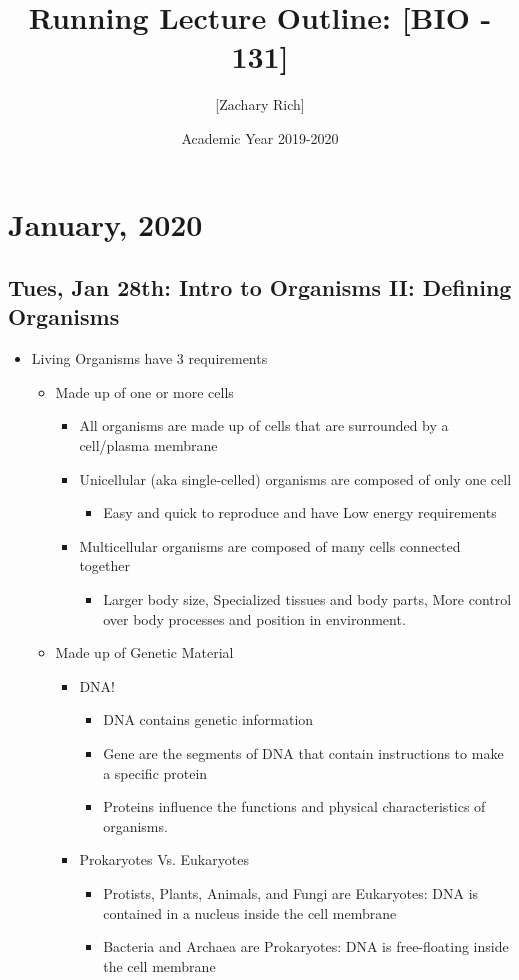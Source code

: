 \documentclass[10pt, oneside]{article}
\title{Running Lecture Outline: [BIO - 131]}
\author{[Zachary Rich]}
\date{Academic Year 2019-2020}
\begin{document}
\maketitle
\tableofcontents

\vspace{.25in}

\section{January, 2020}

\subsection{Tues, Jan 28th: Intro to Organisms II: Defining Organisms}

\begin{itemize}

\item Living Organisms have 3 requirements
\begin{itemize}
	\item Made up of one or more cells
	\begin{itemize}
		\item All organisms are made up of cells that are surrounded by a cell/plasma membrane
		\item Unicellular (aka single-celled) organisms are composed of only one cell
			\begin{itemize}
				\item Easy and quick to reproduce and have Low energy requirements
			\end{itemize}
		\item Multicellular organisms are composed of many cells connected together
			\begin{itemize}
				\item Larger body size, Specialized tissues and body parts, More control over body processes and position in environment.
			\end{itemize}
	\end{itemize}
	\item Made up of Genetic Material
		\begin{itemize}
			\item DNA!
			\begin{itemize}
				\item DNA contains genetic information
				\item Gene are the segments of DNA that contain instructions to make a specific protein
				\item Proteins influence the functions and physical characteristics of organisms.
			\end{itemize}
			\item Prokaryotes Vs. Eukaryotes
			\begin{itemize}
				\item Protists, Plants, Animals, and Fungi are Eukaryotes: DNA is contained in a nucleus inside the cell membrane
				\item Bacteria and Archaea are Prokaryotes: DNA is free-floating inside the cell membrane
			\end{itemize}
		\end{itemize}
			

\end{itemize}
\end{itemize}
\end{document}
